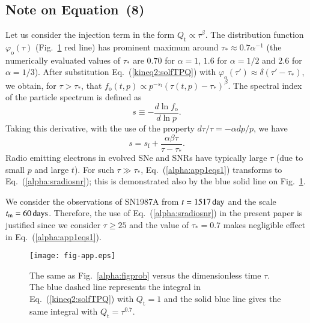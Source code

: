 \documentclass{aa}
\newcommand\un[1]{{\,\rm #1}}
\newcommand\rs[1]{_\mathrm{#1}}
\begin{document}
\begin{appendix}
\section[]{Note on Equation~(8)}
\label{alpha:app1}

Let us consider the injection term in the form $Q\rs{t}\propto \tau^\beta$. The distribution function $\varphi_{\mathrm{o}}(\tau)$ (Fig.~\ref{alpha:figapp} red line) has prominent maximum around $\tau\rs{*}\approx 0.7\alpha^{-1}$ (the numerically evaluated values of $\tau\rs{*}$ are $0.70$ for $\alpha=1$, $1.6$ for $\alpha=1/2$ and $2.6$ for $\alpha=1/3$). 
After substitution Eq.~(\ref{kineq2:solfTPQ}) with $\varphi_{\mathrm{o}}(\tau')\approx \delta(\tau'-\tau\rs{*})$, we obtain, for $\tau>\tau\rs{*}$, that $f\rs{o}(t,p)\propto p^{-s\rs{f}}\left(\tau(t,p)-\tau\rs{*}\right)^{\beta}$. The spectral index of the particle spectrum is defined as
\begin{equation}
 s\equiv -\frac{d\ln f\rs{o}}{d\ln p}.
\end{equation}
Taking this derivative, with the use of the property $d\tau/\tau=-\alpha dp/p$, we have 
\begin{equation}
 s=s\rs{f}+\frac{\alpha\beta\tau}{\tau-\tau\rs{*}}.
 \label{alpha:app1eqs1}
\end{equation}
Radio emitting electrons in evolved SNe and SNRs have typically large $\tau$ (due to small $p$ and large $t$). For such $\tau\gg\tau\rs{*}$, Eq.~(\ref{alpha:app1eqs1}) transforms to Eq.~(\ref{alpha:sradiosnr}); this is demonstrated also by the blue solid line on Fig.~\ref{alpha:figapp}.
 
We consider the observations of SN1987A from $t=1517\un{day}$ and the scale $t\rs{m}=60\un{days}$. Therefore, the use of Eq.~(\ref{alpha:sradiosnr}) in the present paper is justified since we consider $\tau\geq 25$ and the value of $\tau\rs{*}=0.7$ makes negligible effect in Eq.~(\ref{alpha:app1eqs1}).  
 

\begin{figure}[!h]
 \centering
 \texttt{[image: fig-app.eps]}
 \caption{The same as Fig.~\ref{alpha:figprob} versus the dimensionless time $\tau$. The blue dashed line represents the integral in Eq.~(\ref{kineq2:solfTPQ}) with $Q\rs{t}=1$ and the solid blue line gives the same integral with $Q\rs{t}=\tau^{0.7}$.
               }
 \label{alpha:figapp}
\end{figure}


\end{appendix}


\end{document}

